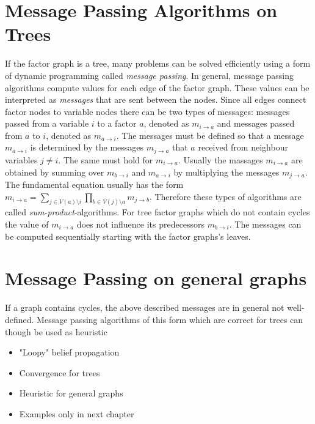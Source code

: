 \section{Message Passing Algorithms on Trees}

If the factor graph is a tree, many problems can be solved efficiently using a form of dynamic programming called \emph{message passing}. \newline 
In general, message passing algorithms compute values for each edge of the factor graph. These values can be interpreted as \emph{messages} that are sent between the nodes. Since all edges connect factor nodes to variable nodes there can be two types of messages: messages passed from a variable $i$ to a factor $a$, denoted as $m_{i \rightarrow a}$ and messages passed from $a$ to $i$, denoted as $m_{a \rightarrow i}$. \newline
The messages must be defined so that a message $m_{a \rightarrow i}$ is determined by the messages $m_{j \rightarrow a}$ that $a$ received from neighbour variables $j \neq i$. 
The same must hold for $m_{i \rightarrow a}$. \newline
Usually the massages $m_{i \rightarrow a}$ are obtained by summing over $m_{b \rightarrow i}$ and $m_{a \rightarrow i}$ by multiplying the messages $m_{j \rightarrow a}$. The fundamental equation usually has the form $m_{i \rightarrow a} = \sum_{j \in V(a) \setminus i} \prod_{b \in V(j) \setminus a} m_{j \rightarrow b}$. Therefore these types of algorithms are called \emph{sum-product}-algorithms. \newline
For tree factor graphs which do not contain cycles the value of $m_{i \rightarrow a}$ does not influence its predecessors $m_{b \rightarrow i}$. The messages can be computed sequentially starting with the factor graphs's leaves.


\section{Message Passing on general graphs}
If a graph contains cycles, the above described messages are in general not well-defined. Message passing algorithms of this form which are correct for trees can though be used as heuristic  
\begin{itemize}
	\item "Loopy" belief propagation
	\item Convergence for trees
	\item Heuristic for general graphs
	\item Examples only in next chapter
\end{itemize}

